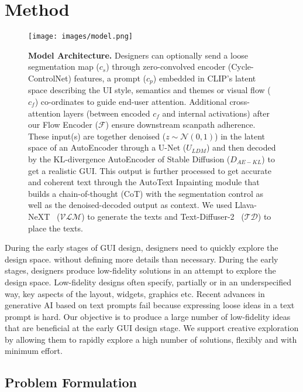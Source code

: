 \section{Method}
\label{sec:synthesis}

\begin{figure}
    \centering
    \texttt{[image: images/model.png]}
    \caption{\textbf{Model Architecture.} Designers can optionally send a loose segmentation map ($c_s$) through zero-convolved encoder (Cycle-ControlNet) features, a prompt ($c_p$) embedded in CLIP's latent space describing the UI style, semantics and themes or visual flow ($c_f$) co-ordinates to guide end-user attention. 
    Additional cross-attention layers (between encoded $c_f$ and internal activations) after our Flow Encoder ($\mathcal{F}$) ensure downstream scanpath adherence.
    These input(s) are together denoised ($z \sim \mathcal{N}(0, 1)$) in the latent space of an AutoEncoder through a U-Net ($U_{LDM}$) and then decoded by the KL-divergence AutoEncoder of Stable Diffusion ($D_{AE-KL}$) to get a realistic GUI.
    This output is further processed to get accurate and coherent text through the AutoText Inpainting module that builds a chain-of-thought (CoT) with the segmentation control as well as the denoised-decoded output as context.
    We used Llava-NeXT~\cite{llavanext} ($\mathcal{VLM}$) to generate the texts and Text-Diffuser-2~\cite{chen2023textdiffuser} ($\mathcal{TD}$) to place the texts.
    }
    \label{fig:model}
\end{figure}

During the early stages of GUI design, designers need to quickly explore the design space. without defining more details than necessary. 
During the early stages, designers produce low-fidelity solutions in an attempt to explore the design space.
Low-fidelity designs often specify, partially or in an underspecified way, key aspects of the layout, widgets, graphics etc.
Recent advances in generative AI based on text prompts fail because expressing loose ideas in a text prompt is hard. 
Our objective is to produce a large number of low-fidelity ideas that are beneficial at the early GUI design stage.
We support creative exploration by allowing them to rapidly explore a high number of solutions, flexibly and with minimum effort.


\subsection{Problem Formulation}

